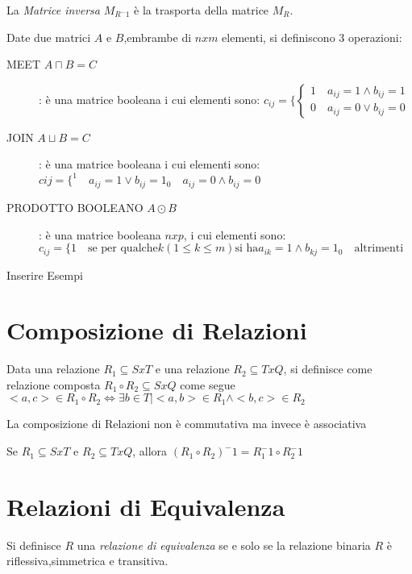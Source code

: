 La \emph{Matrice inversa} $M_{R ^-1}$ è la trasporta della matrice $M_R$.

Date due matrici $A$ e $B$,embrambe di $n x m$ elementi, si definiscono 3 operazioni:
\begin{description}
    \item[MEET $A \sqcap B = C$]: è una matrice booleana i cui elementi sono:
$c_{ij} = \{ \begin{cases} 1 \quad a_{ij} = 1 \land b_{ij} = 1 \\ 0 \quad a_{ij} = 0 \lor b_{ij} = 0 \end{cases}$
    \item[JOIN $A \sqcup B = C$]: è una matrice booleana i cui elementi sono:
    $c{ij} = \{ ^ 1 \quad a_{ij} = 1 \lor b_{ij} = 1 _ 0 \quad a_{ij} = 0 \land b_{ij} = 0$
    \item[PRODOTTO BOOLEANO $A \odot B$]: è una matrice booleana $n x p$, i cui elementi sono:
    $c_{ij} = \{1 \quad \text{se per qualche} k(1 \leq k \leq m) \text{si ha} a_{ik} = 1 \land b_{kj} = 1
    _ 0 \quad \text{altrimenti}$
\end{description}

Inserire Esempi

\section{Composizione di Relazioni}
Data una relazione $R_1 \subseteq S x T$ e una relazione $R_2 \subseteq T x Q$,
si definisce come relazione composta $R_1 \circ R_2 \subseteq S x Q$ come segue
$<a,c> \in R_1 \circ R_2 \iff \exists b \in T | <a,b> \in R_1 \land <b,c> \in R_2$


\begin{prop}
La composizione di Relazioni non è commutativa ma invece è associativa
\end{prop}

\begin{thm}
Se $R_1 \subseteq S x T$ e $R_2 \subseteq T x Q$, allora $(R_1 \circ R_2)^-1 = R_1^-1 \circ R_2^-1$
\end{thm}




\section{Relazioni di Equivalenza}
Si definisce $R$ una \emph{relazione di equivalenza} se e solo se la relazione binaria
$R$ è riflessiva,simmetrica e transitiva.

